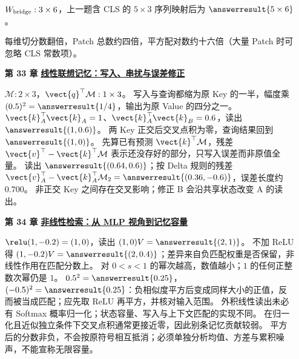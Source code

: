 \begin{enumerate}[leftmargin=5.4em,labelsep=.7em,itemsep=9pt]
\par{}$W_{\rm bridge}:3\times6$，上一题含 CLS 的 $5\times3$ 序列映射后为 $\answerresult{5\times6}$。
\par{}每维切分数翻倍，Patch 总数约四倍，平方配对数约十六倍（大量 Patch 时可忽略 CLS 常数项）。
\par{}
\item[\textbf{第 33 章}] \label{answer:04-key-value-outer-product}\textbf{\hyperref[check:04-key-value-outer-product]{线性联想记忆：写入、串扰与误差修正}}\par\nobreak
{}\label{answer:06-better-linear-memory}
$\mathcal{M}:2\times3$，$\vect{q}^\top\mathcal{M}:1\times3$。
写入与查询都缩为原 Key 的一半，幅度乘 $(0.5)^2=\answerresult{1/4}$，输出为原 Value 的四分之一。
$\vect{k}_A^\top\vect{k}_A=1$、$\vect{k}_A^\top\vect{k}_B=0.6$，读出 $\answerresult{(1,0.6)}$。
两 Key 正交后交叉点积为零，查询结果回到 $\answerresult{(1,0)}$。
先算已有预测 $\vect{k}^\top\mathcal{M}$，残差 $\vect{v}^\top-\vect{k}^\top\mathcal{M}$ 表示还没存好的部分，只写入误差而非原值全量。
读出 $\answerresult{(0.64,0.6)}$；按 Delta 规则的残差 $\vect{v}_A^\top-\vect{k}_A^\top\mathcal{M}_2=\answerresult{(0.36,-0.6)}$，误差长度约 $0.700$。
非正交 Key 之间存在交叉影响；修正 B 会沿共享状态改变 A 的读出。
\par{}
\item[\textbf{第 34 章}] \label{answer:09-nonlinearity-and-memory}\textbf{\hyperref[check:09-nonlinearity-and-memory]{非线性检索：从 MLP 视角到记忆容量}}\par\nobreak
{}\label{answer:13-capacity}
$\relu(1,-0.2)=(1,0)$，读出 $(1,0)V=\answerresult{(2,1)}$。
不加 ReLU 得 $(1,-0.2)V=\answerresult{(2,0.4)}$；差异来自负匹配权重是否保留，非线性作用在匹配分数上。
对 $0<s<1$ 的幂次越高，数值越小；$1$ 的任何正整数次幂仍是 $1$。
$0.5^2=\answerresult{0.25}$，$(-0.5)^2=\answerresult{0.25}$：负相似度平方后变成同样大小的正值，反而被当成匹配；应先取 ReLU 再平方，并核对输入范围。
外积线性读出未必有 Softmax 概率归一化；状态容量、写入与上下文匹配的实现不同。
在归一化且近似独立条件下交叉点积通常更接近零，因此别条记忆贡献较弱。
平方后的分数非负，不会按原符号相互抵消；必须单独分析均值、方差与累积噪声，不能宣称无限容量。

\end{enumerate}
\endgroup
